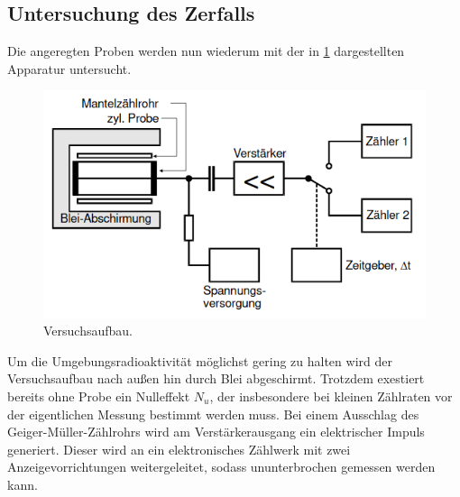 \subsection{Untersuchung des Zerfalls}
    Die angeregten Proben werden nun wiederum mit der in \ref{fig:lailai} dargestellten Apparatur untersucht.
    \begin{figure}[H]
        \centering
        \includegraphics[width=\textwidth]{Aufbau.png}
        \caption{Versuchsaufbau.}
        \label{fig:lailai}
    \end{figure}
    Um die Umgebungsradioaktivität möglichst gering zu halten wird der Versuchsaufbau nach 
    außen hin durch Blei abgeschirmt. Trotzdem exestiert bereits ohne Probe ein Nulleffekt $N_u$, 
    der insbesondere bei kleinen Zählraten vor der eigentlichen Messung bestimmt werden muss. 
    Bei einem Ausschlag des Geiger-Müller-Zählrohrs wird 
    am Verstärkerausgang ein elektrischer Impuls generiert. Dieser wird an ein elektronisches
    Zählwerk mit zwei Anzeigevorrichtungen weitergeleitet, sodass ununterbrochen gemessen 
    werden kann. 
